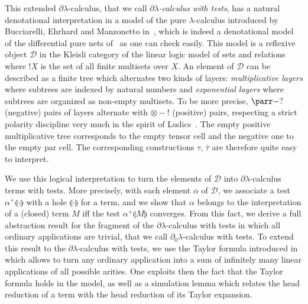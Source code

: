 \documentclass{LMCS}
\newcommand{\dlam}{\ensuremath{\partial\lambda}}
\newcommand{\dzlam}{\ensuremath{\partial_0\lambda}}
\renewcommand{\hole}[1]{\llparenthesis #1\rrparenthesis}
\newcommand{\cont}[2]{#1^{+}\hole{#2}}
\newcommand{\gto}{\ensuremath{\bar\tau}}
\newcommand{\cD}{\mathcal{D}}
\begin{document}
This extended \dlam-calculus, that we call \emph{\dlam-calculus with tests}, has a natural denotational
interpretation in a model of the pure $\lambda$-calculus introduced by
Bucciarelli, Ehrhard and Manzonetto in~\cite{BucciarelliEM07},
which is indeed a denotational model of the differential pure nets
of~\cite{EhrhardL10} as one can check easily. This model is a reflexive
object $\cD$   in the Kleisli category of the linear logic model of sets and relations where $!X$
is the set of all finite multisets over $X$. An element of $\cD$ can be described as a finite
tree which alternates two kinds of layers: \emph{multiplicative layers} where
subtrees are indexed by natural numbers and \emph{exponential layers} where
subtrees are organized as non-empty multisets. To be more precise, $\parr-?$
(negative) pairs of layers alternate with $\otimes-!$ (positive) pairs,
respecting a strict polarity discipline very much in the spirit of
Ludics~\cite{Girard03}. The empty positive multiplicative tree corresponds to the
empty tensor cell and the negative one to the empty par cell.  The
corresponding constructions $\tau$, $\gto$ are therefore quite easy to
interpret.


We use this logical interpretation to turn the elements of $\cD$ into 
\dlam-calculus terms with tests. 
More precisely, with each element $\alpha$ of $\cD$, we
associate a test $\cont{\alpha}{\cdot}$ with a hole $\hole{\cdot}$ for a term, and we show that
$\alpha$ belongs to the interpretation of a (closed) term $M$ iff the test
$\cont{\alpha}{M}$ converges. From this fact, we derive  a full abstraction
result for the fragment of the \dlam-calculus with tests in
which all ordinary applications are trivial, that we call \dzlam-calculus with tests.
To extend this
result to the \dlam-calculus with tests, we
use the Taylor formula introduced in~\cite{EhrhardR03} which
allows to turn any ordinary application into a sum of infinitely many linear
applications of all possible arities. One exploits then the fact that the
Taylor formula holds in the model, as well as a simulation lemma
which relates the head reduction of a term with the head reduction of its
Taylor expansion.
\end{document}

